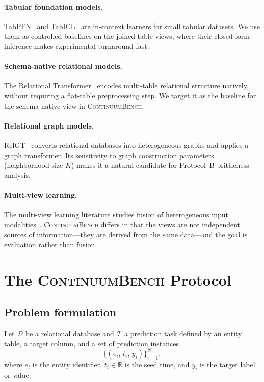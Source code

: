\documentclass[11pt]{article}
\newcommand{\cb}{\textsc{ContinuumBench}}
\begin{document}
\paragraph{Tabular foundation models.}
TabPFN~\citep{tabpfn} and TabICL~\citep{tabicl} are in-context learners
for small tabular datasets.
We use them as controlled baselines on the joined-table views, where
their closed-form inference makes experimental turnaround fast.

\paragraph{Schema-native relational models.}
The Relational Transformer~\citep{rt} encodes multi-table relational
structure natively, without requiring a flat-table preprocessing step.
We target it as the baseline for the schema-native view in \cb{}.

\paragraph{Relational graph models.}
RelGT~\citep{relgt} converts relational databases into heterogeneous
graphs and applies a graph transformer.
Its sensitivity to graph construction parameters (neighborhood size $K$)
makes it a natural candidate for Protocol~B brittleness analysis.

\paragraph{Multi-view learning.}
The multi-view learning literature studies fusion of heterogeneous
input modalities~\citep{multiview_survey}.
\cb{} differs in that the views are not independent sources of
information---they are derived from the same data---and the goal is
evaluation rather than fusion.

\section{The \cb{} Protocol}
\label{sec:protocol}

\subsection{Problem formulation}

Let $\mathcal{D}$ be a relational database and $\mathcal{T}$ a
prediction task defined by an entity table, a target column, and a
set of prediction instances
\[
  \{(e_i,\, t_i,\, y_i)\}_{i=1}^{N},
\]
where $e_i$ is the entity identifier, $t_i \in \mathbb{R}$ is the
seed time, and $y_i$ is the target label or value.
\end{document}
